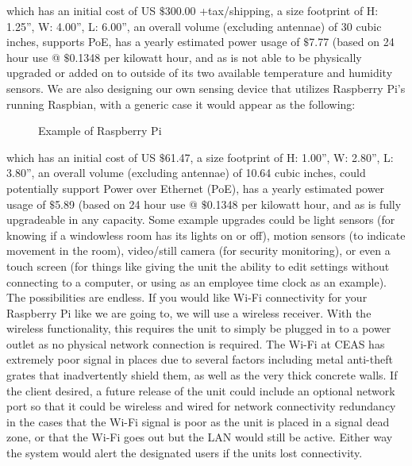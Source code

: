 \documentclass{report}
\begin{document}
 which has an initial cost of US $\$$300.00 +tax/shipping, a size footprint of H: 1.25”, W: 4.00”, L: 6.00”, an overall volume (excluding antennae) of 30 cubic inches, supports PoE, has a yearly estimated power usage of $\$$7.77 (based on 24 hour use @ $\$$0.1348 per kilowatt hour, and as is not able to be physically upgraded or added on to outside of its two available temperature and humidity sensors.
\newline
\indent
We are also designing our own sensing device that utilizes Raspberry Pi’s running Raspbian, with a generic case it would appear as the following:
\begin{figure}[H]
\caption{Example of Raspberry Pi}
\end{figure}
which has an initial cost of US $\$$61.47, a size footprint of H: 1.00”, W: 2.80”, L: 3.80”, an overall volume (excluding antennae) of 10.64 cubic inches, could potentially support Power over Ethernet (PoE), has a yearly estimated power usage of $\$$5.89 (based on 24 hour use @ $\$$0.1348 per kilowatt hour, and as is fully upgradeable in any capacity.
Some example upgrades could be light sensors (for knowing if a windowless room has its lights on or off), motion sensors (to indicate movement in the room), video/still camera (for security monitoring), or even a touch screen (for things like giving the unit the ability to edit settings without connecting to a computer, or using as an employee time clock as an example).
The possibilities are endless.
If you would like Wi-Fi connectivity for your Raspberry Pi like we are going to, we will use a wireless receiver. With the wireless functionality, this requires the unit to simply be plugged in to a power outlet as no physical network connection is required. The Wi-Fi at CEAS has extremely poor signal in places due to several factors including metal anti-theft grates that inadvertently shield them, as well as the very thick concrete walls. If the client desired, a future release of the unit could include an optional network port so that it could be wireless and wired for network connectivity redundancy in the cases that the Wi-Fi signal is poor as the unit is placed in a signal dead zone, or that the Wi-Fi goes out but the LAN would still be active.  Either way the system would alert the designated users if the units lost connectivity.
\end{document}
